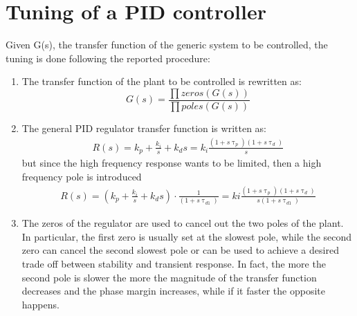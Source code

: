 \newpage
\section{Tuning of a PID controller}\label{sec:e_pid_tuning}
 Given G(s), the transfer function of the generic system to be controlled, the tuning is done following the reported procedure:
 \begin{enumerate}
    \item The transfer function of the plant to be controlled is rewritten as:
    \begin{equation}
        G(s) = \frac{\prod zeros(G(s))}{\prod poles(G(s))}
    \end{equation}
    \item The general PID regulator transfer function is written as:
    \begin{gather}
         R(s) = k_p+\frac{k_i}{s}+k_ds=k_i\frac{(1+s\uptau_p)(1+s\uptau_d)}{s}
         \label{eq:regulator3}
    \end{gather}
    but since the high frequency response wants to be limited, then a high frequency pole is introduced
    \begin{gather}
         R(s) = \left(k_p+\frac{k_i}{s}+k_ds\right)\cdot \frac{1}{(1+s\uptau_{d1})} = ki\frac{(1+s\uptau_p)(1+s\uptau_d)}{s(1+s\uptau_{d1})}
         \label{eq:regulator4}
    \end{gather}
    \item The zeros of the regulator are used to cancel out the two poles of the plant. In particular, the first zero is usually set at the slowest pole, while the second zero can cancel the second slowest pole or can be used to achieve a desired trade off between stability and transient response. In fact, the more the second pole is slower the more the magnitude of the transfer function decreases and the phase margin increases, while if it faster the opposite happens.

\end{enumerate}
